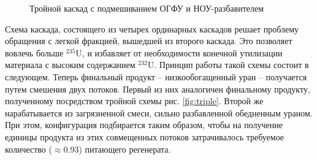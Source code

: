 \begin{figure}[ht]
  \caption{Тройной каскад с подмешиванием ОГФУ и НОУ-разбавителем}\label{fig:Tomsk}
\end{figure}

Схема каскада, состоящего из четырех ординарных каскадов решает проблему обращения с легкой фракцией, вышедшей из второго каскада.
Это позволяет вовлечь больше $^{235}$U, и избавляет от необходимости конечной утилизации материала с высоким содержанием $^{232}$U.
Принцип работы такой схемы состоит в следующем.
Теперь финальный продукт -- низкообогащенный уран -- получается путем смешения двух потоков.
Первый из них аналогичен финальному продукту, полученному посредством тройной схемы рис. \ref{fig:triple}.
Второй же нарабатывается из загрязненной смеси, сильно разбавленной обедненным ураном.
При этом, конфигурация подбирается таким образом, чтобы на получение единицы продукта из этих совмещенных потоков затрачивалось требуемое количество ($\approx$0.93) питающего регенерата.

